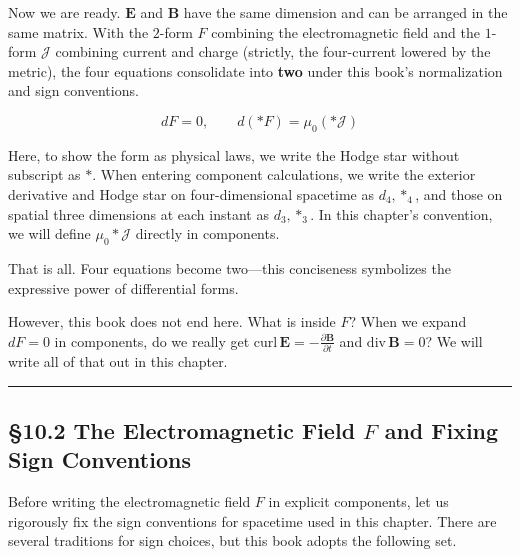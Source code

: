 Now we are ready. \(\mathbf{E}\) and \(\mathbf{B}\) have the same
dimension and can be arranged in the same matrix. With the \(2\)-form
\(F\) combining the electromagnetic field and the \(1\)-form
\(\mathcal{J}\) combining current and charge (strictly, the four-current
lowered by the metric), the four equations consolidate into \textbf{two}
under this book's normalization and sign conventions.

\[dF = 0, \qquad d(\ast F) = \mu_0(\ast\mathcal{J})\]

Here, to show the form as physical laws, we write the Hodge star without
subscript as \(\ast\). When entering component calculations, we write
the exterior derivative and Hodge star on four-dimensional spacetime as
\(d_4,\ast_4\), and those on spatial three dimensions at each instant as
\(d_3,\ast_3\). In this chapter's convention, we will define
\(\mu_0\ast\mathcal{J}\) directly in components.

That is all. Four equations become two---this conciseness symbolizes the
expressive power of differential forms.

However, this book does not end here. What is inside \(F\)? When we
expand \(dF=0\) in components, do we really get
\(\mathrm{curl}\,\mathbf{E} = -\frac{\partial\mathbf{B}}{\partial t}\)
and \(\mathrm{div}\,\mathbf{B} = 0\)? We will write all of that out in
this chapter.

\begin{center}\rule{0.5\linewidth}{0.5pt}\end{center}

\hypertarget{the-electromagnetic-field-f-and-fixing-sign-conventions}{%
\subsection{\texorpdfstring{§10.2 The Electromagnetic Field \(F\) and
Fixing Sign
Conventions}{§10.2 The Electromagnetic Field F and Fixing Sign Conventions}}\label{the-electromagnetic-field-f-and-fixing-sign-conventions}}

Before writing the electromagnetic field \(F\) in explicit components,
let us rigorously fix the sign conventions for spacetime used in this
chapter. There are several traditions for sign choices, but this book
adopts the following set.

